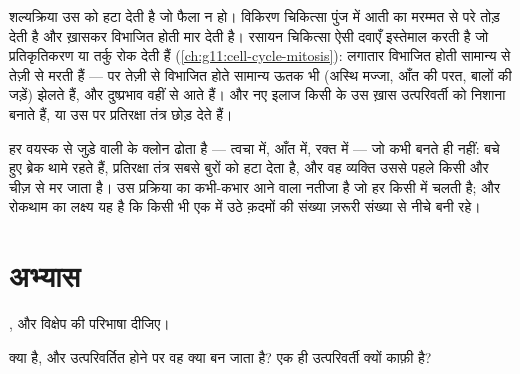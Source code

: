 \begin{example}[इलाज और उनके निशाने]\label{ex:g11:cancer:treatments}
शल्यक्रिया उस  को हटा देती है जो फैला न हो। विकिरण चिकित्सा पुंज में
आती  का  मरम्मत से परे तोड़ देती है और ख़ासकर विभाजित होती
 मार देती है। रसायन चिकित्सा ऐसी दवाएँ इस्तेमाल करती है जो
प्रतिकृतिकरण या तर्कु रोक देती हैं (\cref{ch:g11:cell-cycle-mitosis}):
लगातार विभाजित होती   सामान्य  से तेज़ी से मरती हैं
--- पर तेज़ी से विभाजित होते सामान्य ऊतक भी (अस्थि मज्जा, आँत की परत,
बालों की जड़ें) झेलते हैं, और दुष्प्रभाव वहीं से आते हैं। और नए इलाज किसी
 के उस ख़ास उत्परिवर्ती  को निशाना बनाते हैं, या उस पर
प्रतिरक्षा तंत्र छोड़ देते हैं।
\end{example}

\begin{remark}[हम सब उसकी शुरुआत क्यों ढोते हैं]\label{rem:g11:cancer:everyone}
हर वयस्क  से जुड़े  वाली  के क्लोन ढोता है ---
त्वचा में, आँत में, रक्त में --- जो कभी  बनते ही नहीं: बचे हुए ब्रेक
थामे रहते हैं, प्रतिरक्षा तंत्र सबसे बुरों को हटा देता है, और वह व्यक्ति
उससे पहले किसी और चीज़ से मर जाता है।  उस प्रक्रिया का कभी-कभार आने
वाला नतीजा है जो हर किसी में चलती है; और रोकथाम का लक्ष्य यह है कि किसी भी
एक  में उठे क़दमों की संख्या ज़रूरी संख्या से नीचे बनी रहे।
\end{remark}

\section{अभ्यास}

\begin{exercise}[$\star$]\label{exo:g11:cancer:1}
,  और विक्षेप की परिभाषा दीजिए।
\end{exercise}

\begin{exercise}[$\star$]\label{exo:g11:cancer:2}
 क्या है, और उत्परिवर्तित होने पर वह क्या बन जाता है? एक ही
उत्परिवर्ती  क्यों काफ़ी है?
\end{exercise}


